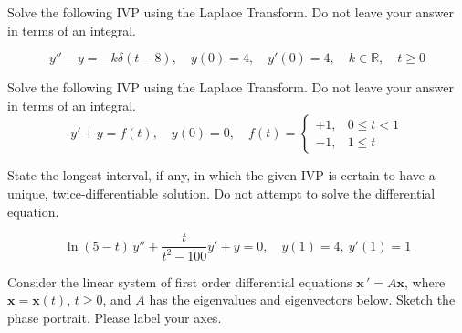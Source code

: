 \documentclass[12pt]{exam}
\begin{document}
\begin{questions}
\begin{enumerate}[label=\roman*)]
    \end{enumerate}    
  
    
    
    
    
    
    
    \newpage \Initials
    \question[7] Solve the following IVP using the Laplace Transform. Do not leave your answer in terms of an integral. 
        
        
        $$y''-y=-k\delta(t-8), \quad y(0)=4,\quad y'(0)=4, \quad k \in \mathbb R, \quad t \ge 0$$ %
      
    
    
    


\newpage \Initials

    \question[10] Solve the following IVP using the Laplace Transform. Do not leave your answer in terms of an integral. 
  $$ y' + y = f(t), \quad y(0) = 0, \quad f(t) = \begin{cases} +1, & 0 \le t < 1 \\ -1 , & 1 \le t \end{cases}
  $$
    
    
    
\newpage \Initials
    \question[2] State the longest interval, if any, in which the given IVP is certain to have a unique, twice-differentiable solution. Do not attempt to solve the differential equation. 
    

    $$\ln (5 - t) \, y''+\frac{t}{t^2-100}y'+y=0, \quad y(1)=4,\ y'(1)=1$$ %
    
    \vspace{2cm} 

    \question[3] Consider the linear system of first order differential equations $\displaystyle \mathbf x \, ' = A \mathbf x$, where $\mathbf x = \mathbf x(t)$, $t\ge 0$, and $A$ has the eigenvalues and eigenvectors below. Sketch the phase portrait. Please label your axes.
    

\end{questions}
\end{document}
